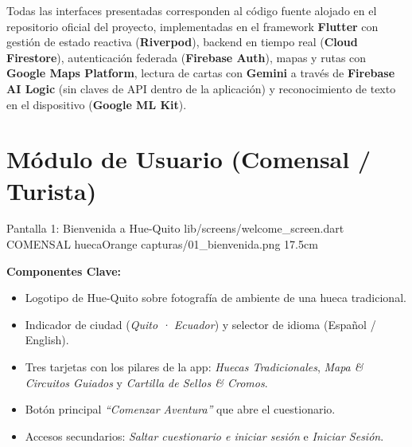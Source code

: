 \vspace{0.5cm}
\begin{tcolorbox}[
  enhanced,
  colback=huecaOrange!5,
  colframe=huecaOrange,
  arc=2.5mm,
  boxrule=0.8pt,
  title=\textbf{\faIcon{info-circle}\ Nota de Integridad Técnica}
]
  Todas las interfaces presentadas corresponden al código fuente alojado en el repositorio oficial del proyecto, implementadas en el framework \textbf{Flutter} con gestión de estado reactiva (\textbf{Riverpod}), backend en tiempo real (\textbf{Cloud Firestore}), autenticación federada (\textbf{Firebase Auth}), mapas y rutas con \textbf{Google Maps Platform}, lectura de cartas con \textbf{Gemini} a través de \textbf{Firebase AI Logic} (sin claves de API dentro de la aplicación) y reconocimiento de texto en el dispositivo (\textbf{Google ML Kit}).
\end{tcolorbox}

\vspace{0.8cm}
\tableofcontents
\newpage

\section{Módulo de Usuario (Comensal / Turista)}
\skipnewpagetrue

\pantallashowcase
  {Pantalla 1: Bienvenida a Hue-Quito}
  {lib/screens/welcome_screen.dart}
  {COMENSAL}
  {huecaOrange}
  {capturas/01_bienvenida.png}
  {17.5cm}
  {

    \textbf{Componentes Clave:}
    \begin{itemize}[leftmargin=*, itemsep=2pt]
      \item Logotipo de Hue-Quito sobre fotografía de ambiente de una hueca tradicional.
      \item Indicador de ciudad (\textit{Quito · Ecuador}) y selector de idioma (Español / English).
      \item Tres tarjetas con los pilares de la app: \textit{Huecas Tradicionales}, \textit{Mapa \& Circuitos Guiados} y \textit{Cartilla de Sellos \& Cromos}.
      \item Botón principal \textit{``Comenzar Aventura''} que abre el cuestionario.
      \item Accesos secundarios: \textit{Saltar cuestionario e iniciar sesión} e \textit{Iniciar Sesión}.
    \end{itemize}
  }

